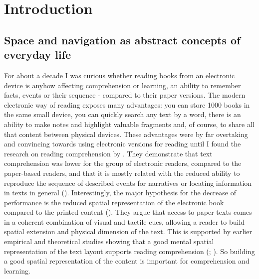 \chapter{Introduction}
\label{ch:intro}

\section{Space and navigation as abstract concepts of everyday life}
\label{sec:navig_in_life}

For about a decade I was curious whether reading books from an electronic device is anyhow affecting comprehension or learning, an ability to remember facts, events or their sequence - compared to their paper versions. The modern electronic way of reading exposes many advantages: you can store 1000 books in the same small device, you can quickly search any text by a word, there is an ability to make notes and highlight valuable fragments and, of course, to share all that content between physical devices. These advantages were by far overtaking and convincing towards using electronic versions for reading until I found the research on reading comprehension by \cite{Mangen2013}. They demonstrate that text comprehension was lower for the group of electronic readers, compared to the paper-based readers, and that it is mostly related with the reduced ability to reproduce the sequence of described events for narratives or locating information in texts in general (\cite{GiuliaCataldo2000}). Interestingly, the major hypothesis for the decrease of performance is the reduced spatial representation of the electronic book compared to the printed content (\cite{Mangen2013}). They argue that access to paper texts comes in a coherent combination of visual and tactile cues, allowing a reader to build spatial extension and physical dimension of the text. This is supported by earlier empirical and theoretical studies showing that a good mental spatial representation of the text layout supports reading comprehension (\cite{Kintsch1998}; \cite{PIOLAT1997565}). So building a good spatial representation of the content is important for comprehension and learning.

